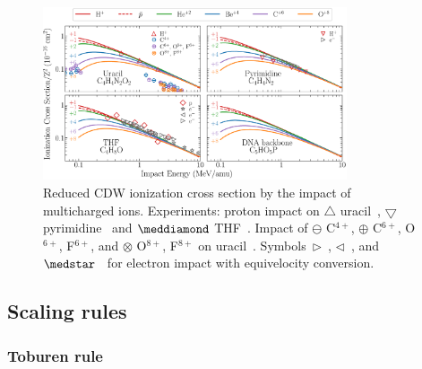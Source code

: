 \documentclass[10pt,showpacs,twocolumn]{revtex4}
\begin{document}
\begin{figure}[t!]
\centering
\includegraphics[width=0.8\textwidth]{adn2.eps}
\caption{Reduced CDW ionization cross section by the impact of 
multicharged ions. Experiments: proton impact on 
$\triangle$ uracil~\cite{itoh2013}, 
$\bigtriangledown$ pyrimidine~\cite{wolff2014} and $\meddiamond$
THF~\cite{wang2016}. Impact of $\ominus$ C$^{4+}$, 
$\oplus$ C$^{6+}$, O$^{6+}$, F$^{6+}$, and
$\otimes$ O$^{8+}$, F$^{8+}$ on 
uracil~\cite{agnihotri2012,agnihotri2013}. 
Symbols~$\rhd$~\cite{bug2017}, $\lhd$~\cite{wolf2019}, and 
$\medstar$~\cite{fuss2009} for electron impact with equivelocity 
conversion.}
\label{fig:crossDNA_2}
\end{figure} 

\subsection{Scaling rules}
\label{subsec:scaling}
\subsubsection{Toburen rule}
\end{document}
